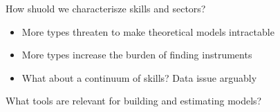 \documentclass[12pt, final]{article}
\begin{document}
How shuold we characterisze skills and sectors?
\begin{itemize}
    \item More types threaten to make theoretical models intractable
    \item More types increase the burden of finding instruments
    \item What about a continuum of skills? Data issue arguably
\end{itemize}

What tools are relevant for building and estimating models?


\fi
\end{document}
